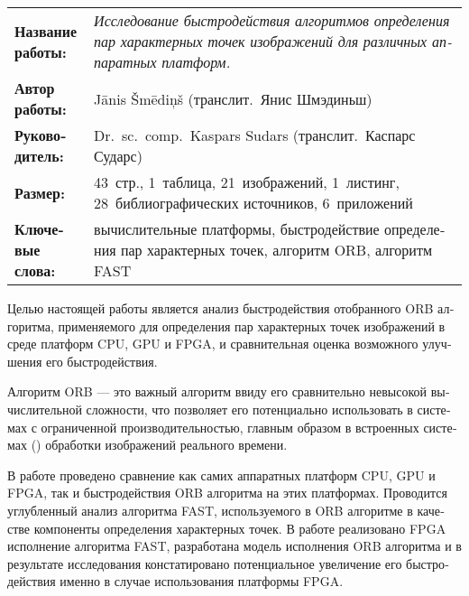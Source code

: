 \clearpage
\begin{russian} %
	\abstitlestyle{\abstractname} %
	\noindent%
	\begin{tabularx}{\textwidth}{lX}
		\textbf{Название работы:} & 
			\textit{Исследование быстродействия алгоритмов определения пар
			характерных точек изображений для различных аппаратных платформ.}\\[1ex]
		\textbf{Автор работы:} & Jānis Šmēdiņš (транслит.~Янис Шмэдиньш)\\[1ex]
		\textbf{Руководитель:} & Dr.~sc.~comp.~Kaspars Sudars 
			(транслит.~Каспарс Сударс)\\[1ex]
		\textbf{Размер:} & 43~стр., 1~таблица, 21~изображений, 1~листинг,
	                       28~библиографических источников, 6~приложений\\[1ex]
		\textbf{Ключевые слова:} & 
			вычислительные платформы,
			быстродействие определения пар характерных точек,
			алгоритм ORB,
			алгоритм FAST
	\end{tabularx}
	
	\vspace{1em}
	Целью настоящей работы является анализ быстродействия отобранного ORB
	алгоритма, применяемого для определения пар характерных точек изображений
	в среде платформ CPU, GPU и FPGA, и сравнительная оценка возможного
	улучшения его быстродействия.
	
	Алгоритм ORB --- это важный алгоритм ввиду его сравнительно невысокой
	вычислительной сложности, что позволяет его  потенциально использовать
	в системах с ограниченной производительностью, главным образом в
	встроенных системах ()
	обработки изображений реального времени.
	
	В работе проведено сравнение как самих аппаратных платформ
	CPU, GPU и FPGA, так и быстродействия ORB алгоритма на этих платформах.
	Проводится углубленный анализ алгоритма FAST, используемого в ORB
	алгоритме в качестве компоненты определения характерных точек.
	В работе реализовано FPGA исполнение алгоритма FAST, разработана
	модель исполнения ORB алгоритма и в результате исследования
	констатировано потенциальное увеличение его быстродействия именно в
	случае использования платформы FPGA.
\end{russian}
